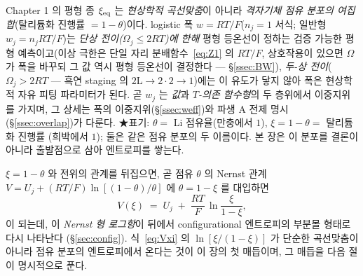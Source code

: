 \begin{keybox}
Chapter 1 의 평형 종 $\xi_{\mathrm{eq}}$ 는 \emph{현상학적 곡선맞춤}이 아니라 \emph{격자기체 점유 분포의 여집합}(탈리튬화
진행률 $=1-\theta$)이다. logistic 폭 $w=RT/F$($n_j{=}1$ 서식; 일반형 $w_j=n_jRT/F$)는 \emph{단상
전이($\Omega_j\le2RT$)에 한해} 평형 등온선이 정하는 검증 가능한 평형 예측이고(이상 극한은 단일 자리
분배함수~\eqref{eq:Z1} 의 $RT/F$, 상호작용이 있으면 $\Omega$ 가 폭을 바꾸되 그 값 역시 평형 등온선이
결정한다 --- \S\ref{ssec:BW}), \emph{두-상 전이}($\Omega_j>2RT$ --- 흑연 staging 의 $2\mathrm L\!\to\!2\cdot
2\!\to\!1$)에는 이 유도가 닿지 않아 폭은 현상학적 자유 피팅 파라미터가 된다. 곧 $w_j$ 는 \emph{값}과 \emph{$T$-의존
함수형}의 두 층위에서 이중지위를 가지며, 그 상세는 폭의 이중지위(\S\ref{ssec:weff})와 파생 A 전제 명시
(\S\ref{ssec:overlap})가 다룬다. ★표기: $\theta=$ Li 점유율(만충에서 $1$), $\xi=1-\theta=$ 탈리튬화 진행률
(희박에서 $1$); 둘은 같은 점유 분포의 두 이름이다. 본 장은 이 분포를 결론이 아니라 출발점으로 삼아 엔트로피를
쌓는다.
\end{keybox}

$\xi=1-\theta$ 와 전위의 관계를 뒤집으면, 곧 점유 $\theta$ 의 Nernst 관계
$V=U_j+(RT/F)\ln[(1-\theta)/\theta]$ 에 $\theta=1-\xi$ 를 대입하면
\begin{equation}
V(\xi) \;=\; U_j \;+\; \frac{RT}{F}\,\ln\!\frac{\xi}{1-\xi},
\label{eq:Vxi}
\end{equation}
이 되는데, 이 \emph{Nernst 형 로그항}이 뒤에서 configurational 엔트로피의 부분몰 형태로 다시 나타난다
(\S\ref{sec:config}). 식~\eqref{eq:Vxi} 의 $\ln[\xi/(1-\xi)]$ 가 단순한 곡선맞춤이 아니라 점유 분포의
엔트로피에서 온다는 것이 이 장의 첫 매듭이며, 그 매듭을 다음 절이 명시적으로 푼다.

